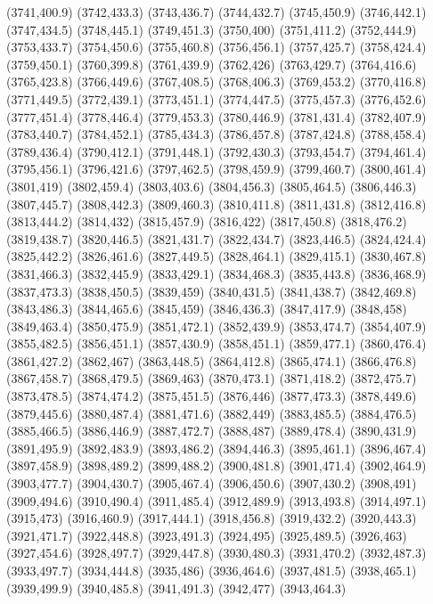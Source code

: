 (3741,400.9)
(3742,433.3)
(3743,436.7)
(3744,432.7)
(3745,450.9)
(3746,442.1)
(3747,434.5)
(3748,445.1)
(3749,451.3)
(3750,400)
(3751,411.2)
(3752,444.9)
(3753,433.7)
(3754,450.6)
(3755,460.8)
(3756,456.1)
(3757,425.7)
(3758,424.4)
(3759,450.1)
(3760,399.8)
(3761,439.9)
(3762,426)
(3763,429.7)
(3764,416.6)
(3765,423.8)
(3766,449.6)
(3767,408.5)
(3768,406.3)
(3769,453.2)
(3770,416.8)
(3771,449.5)
(3772,439.1)
(3773,451.1)
(3774,447.5)
(3775,457.3)
(3776,452.6)
(3777,451.4)
(3778,446.4)
(3779,453.3)
(3780,446.9)
(3781,431.4)
(3782,407.9)
(3783,440.7)
(3784,452.1)
(3785,434.3)
(3786,457.8)
(3787,424.8)
(3788,458.4)
(3789,436.4)
(3790,412.1)
(3791,448.1)
(3792,430.3)
(3793,454.7)
(3794,461.4)
(3795,456.1)
(3796,421.6)
(3797,462.5)
(3798,459.9)
(3799,460.7)
(3800,461.4)
(3801,419)
(3802,459.4)
(3803,403.6)
(3804,456.3)
(3805,464.5)
(3806,446.3)
(3807,445.7)
(3808,442.3)
(3809,460.3)
(3810,411.8)
(3811,431.8)
(3812,416.8)
(3813,444.2)
(3814,432)
(3815,457.9)
(3816,422)
(3817,450.8)
(3818,476.2)
(3819,438.7)
(3820,446.5)
(3821,431.7)
(3822,434.7)
(3823,446.5)
(3824,424.4)
(3825,442.2)
(3826,461.6)
(3827,449.5)
(3828,464.1)
(3829,415.1)
(3830,467.8)
(3831,466.3)
(3832,445.9)
(3833,429.1)
(3834,468.3)
(3835,443.8)
(3836,468.9)
(3837,473.3)
(3838,450.5)
(3839,459)
(3840,431.5)
(3841,438.7)
(3842,469.8)
(3843,486.3)
(3844,465.6)
(3845,459)
(3846,436.3)
(3847,417.9)
(3848,458)
(3849,463.4)
(3850,475.9)
(3851,472.1)
(3852,439.9)
(3853,474.7)
(3854,407.9)
(3855,482.5)
(3856,451.1)
(3857,430.9)
(3858,451.1)
(3859,477.1)
(3860,476.4)
(3861,427.2)
(3862,467)
(3863,448.5)
(3864,412.8)
(3865,474.1)
(3866,476.8)
(3867,458.7)
(3868,479.5)
(3869,463)
(3870,473.1)
(3871,418.2)
(3872,475.7)
(3873,478.5)
(3874,474.2)
(3875,451.5)
(3876,446)
(3877,473.3)
(3878,449.6)
(3879,445.6)
(3880,487.4)
(3881,471.6)
(3882,449)
(3883,485.5)
(3884,476.5)
(3885,466.5)
(3886,446.9)
(3887,472.7)
(3888,487)
(3889,478.4)
(3890,431.9)
(3891,495.9)
(3892,483.9)
(3893,486.2)
(3894,446.3)
(3895,461.1)
(3896,467.4)
(3897,458.9)
(3898,489.2)
(3899,488.2)
(3900,481.8)
(3901,471.4)
(3902,464.9)
(3903,477.7)
(3904,430.7)
(3905,467.4)
(3906,450.6)
(3907,430.2)
(3908,491)
(3909,494.6)
(3910,490.4)
(3911,485.4)
(3912,489.9)
(3913,493.8)
(3914,497.1)
(3915,473)
(3916,460.9)
(3917,444.1)
(3918,456.8)
(3919,432.2)
(3920,443.3)
(3921,471.7)
(3922,448.8)
(3923,491.3)
(3924,495)
(3925,489.5)
(3926,463)
(3927,454.6)
(3928,497.7)
(3929,447.8)
(3930,480.3)
(3931,470.2)
(3932,487.3)
(3933,497.7)
(3934,444.8)
(3935,486)
(3936,464.6)
(3937,481.5)
(3938,465.1)
(3939,499.9)
(3940,485.8)
(3941,491.3)
(3942,477)
(3943,464.3)

